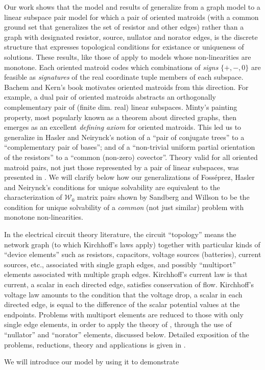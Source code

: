 \documentclass{article}
\newcommand{\extra}[1]{{\small{#1}}}
\begin{document}
Our work \cite{sdcOMP} shows that the model and results of 
\cite{HaslerDApplMath,HaslerNeirynck} generalize from a graph model to a
linear subspace pair model
for which 
a pair of oriented
matroids (with a common ground set that generalizes the
set of resistor and other edges)
rather than a graph with designated resistor, source, nullator
and norator edges,
is the discrete structure 
that expresses 
topological conditions
for existance or uniqueness of solutions.  These results, like
those of \cite{HaslerDApplMath,HaslerNeirynck} apply to
models whose non-linearities are monotone.
Each oriented matroid codes which combinations of \textit{signs} $\{+,-,0\}$
are feasible as \textit{signatures} of the real coordinate tuple  members
of each subspace.
Bachem and Kern's book \cite{BachemKern}
motivates oriented matroids from this direction.  For example, a dual 
pair of oriented matroids abstracts an orthogonally complementary pair
of (finite dim. real) linear subspaces.  Minty's painting property,
most popularly known as a theorem about directed graphs, then emerges
as an excellent \textit{defining axiom} for oriented matroids.
This led us to generalize in \cite{sdcOMP}
Hasler and Neirynck's notion of a ``pair of 
conjugate trees'' to a ``complementary pair of bases''; and of 
a ``non-trivial uniform partial orientation of the resistors''
to a ``common (non-zero) covector''.   
Theory valid for all oriented matroid pairs, not just those represented by
a pair of linear subspaces, was presented in \cite{sdcOMP}.
We will clarify below how our 
generalizations of Foss\'{e}prez, Hasler and Neirynck's conditions
for unique solvability
are equivalent to the characterization of $\mathcal{W}_0$ matrix pairs
shown by Sandberg and Willson \cite{SWExistancePf,W0APPLpaper}
to be the condition for unique solvability
of a \textit{common} (not just similar) 
problem with monotone non-linearities.
\extra{

In the electrical circuit theory literature, the circuit ``topology''
means the network graph (to which Kirchhoff's laws apply)
together with particular kinds of ``device elements''
such as resistors, capacitors, voltage sources (batteries), 
current sources, etc., associated with single graph edges, and possibly
``multiport'' elements associated with multiple graph edges.
Kirchhoff's current law is that current, a scalar in each directed edge,
satisfies conservation of flow.  Kirchhoff's voltage law amounts to the 
condition that 
the voltage drop, a scalar in each directed edge, is equal to the 
difference of the scalar potential values at the endpoints.
Problems with multiport elements are reduced to 
those with only single edge elements, in order to apply
the theory of  \cite{HaslerDApplMath},  through the use of 
``nullator'' and ``norator'' elements, discussed below.  
Detailed exposition of the problems,
reductions, theory and applications is given in \cite{HaslerNeirynck}.

}We will introduce our model by using it to demonstrate
\end{document}
